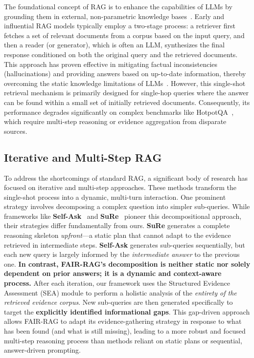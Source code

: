 \documentclass[11pt]{article}
\begin{document}
The foundational concept of RAG is to enhance the capabilities of LLMs by grounding them in external, non-parametric knowledge bases~\cite{lewis2020retrieval}. Early and influential RAG models typically employ a two-stage process: a retriever first fetches a set of relevant documents from a corpus based on the input query, and then a reader (or generator), which is often an LLM, synthesizes the final response conditioned on both the original query and the retrieved documents. This approach has proven effective in mitigating factual inconsistencies (hallucinations) and providing answers based on up-to-date information, thereby overcoming the static knowledge limitations of LLMs~\cite{Huang_2025,guu2020realm}. However, this single-shot retrieval mechanism is primarily designed for single-hop queries where the answer can be found within a small set of initially retrieved documents. Consequently, its performance degrades significantly on complex benchmarks like HotpotQA~\cite{yang2018hotpotqa}, which require multi-step reasoning or evidence aggregation from disparate sources.

\subsection{Iterative and Multi-Step RAG}

To address the shortcomings of standard RAG, a significant body of research has focused on iterative and multi-step approaches. These methods transform the single-shot process into a dynamic, multi-turn interaction. One prominent strategy involves decomposing a complex question into simpler sub-queries. While frameworks like \textbf{Self-Ask}~\cite{press2023measuringnarrowingcompositionalitygap} and \textbf{SuRe}~\cite{kim2024suresummarizingretrievalsusing} pioneer this decompositional approach, their strategies differ fundamentally from ours. \textbf{SuRe} generates a complete reasoning skeleton \emph{upfront}---a static plan that cannot adapt to the evidence retrieved in intermediate steps. \textbf{Self-Ask} generates sub-queries sequentially, but each new query is largely informed by the \emph{intermediate answer} to the previous one. \textbf{In contrast, FAIR-RAG's decomposition is neither static nor solely dependent on prior answers; it is a dynamic and context-aware process.} After each iteration, our framework uses the Structured Evidence Assessment (SEA) module to perform a holistic analysis of the \emph{entirety of the retrieved evidence corpus}. New sub-queries are then generated specifically to target the \textbf{explicitly identified informational gaps}. This gap-driven approach allows FAIR-RAG to adapt its evidence-gathering strategy in response to what has been found (and what is still missing), leading to a more robust and focused multi-step reasoning process than methods reliant on static plans or sequential, answer-driven prompting. 
\end{document}
